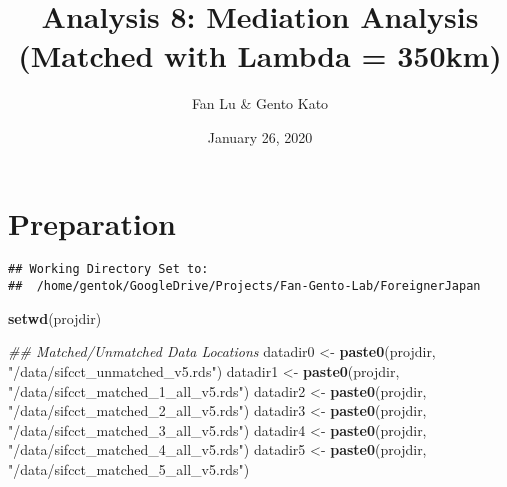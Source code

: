 \documentclass[
]{article}
\title{Analysis 8: Mediation Analysis (Matched with Lambda = 350km)}
\author{Fan Lu \& Gento Kato}
\date{January 26, 2020}
\newenvironment{Shaded}{\begin{snugshade}}{\end{snugshade}}
\newcommand{\CharTok}[1]{\textcolor[rgb]{0.31,0.60,0.02}{#1}}
\newcommand{\CommentTok}[1]{\textcolor[rgb]{0.56,0.35,0.01}{\textit{#1}}}
\newcommand{\ControlFlowTok}[1]{\textcolor[rgb]{0.13,0.29,0.53}{\textbf{#1}}}
\newcommand{\DataTypeTok}[1]{\textcolor[rgb]{0.13,0.29,0.53}{#1}}
\newcommand{\KeywordTok}[1]{\textcolor[rgb]{0.13,0.29,0.53}{\textbf{#1}}}
\newcommand{\NormalTok}[1]{#1}
\newcommand{\OperatorTok}[1]{\textcolor[rgb]{0.81,0.36,0.00}{\textbf{#1}}}
\newcommand{\OtherTok}[1]{\textcolor[rgb]{0.56,0.35,0.01}{#1}}
\newcommand{\StringTok}[1]{\textcolor[rgb]{0.31,0.60,0.02}{#1}}
\begin{document}
\maketitle

\hypertarget{preparation}{%
\section{Preparation}\label{preparation}}

\begin{Shaded}
\end{Shaded}

\begin{verbatim}
## Working Directory Set to:
##  /home/gentok/GoogleDrive/Projects/Fan-Gento-Lab/ForeignerJapan
\end{verbatim}

\begin{Shaded}
\begin{Highlighting}[]
\KeywordTok{setwd}\NormalTok{(projdir)}

\CommentTok{## Matched/Unmatched Data Locations}
\NormalTok{datadir0 <-}\StringTok{ }\KeywordTok{paste0}\NormalTok{(projdir, }\StringTok{"/data/sifcct_unmatched_v5.rds"}\NormalTok{)}
\NormalTok{datadir1 <-}\StringTok{ }\KeywordTok{paste0}\NormalTok{(projdir, }\StringTok{"/data/sifcct_matched_1_all_v5.rds"}\NormalTok{)}
\NormalTok{datadir2 <-}\StringTok{ }\KeywordTok{paste0}\NormalTok{(projdir, }\StringTok{"/data/sifcct_matched_2_all_v5.rds"}\NormalTok{)}
\NormalTok{datadir3 <-}\StringTok{ }\KeywordTok{paste0}\NormalTok{(projdir, }\StringTok{"/data/sifcct_matched_3_all_v5.rds"}\NormalTok{)}
\NormalTok{datadir4 <-}\StringTok{ }\KeywordTok{paste0}\NormalTok{(projdir, }\StringTok{"/data/sifcct_matched_4_all_v5.rds"}\NormalTok{)}
\NormalTok{datadir5 <-}\StringTok{ }\KeywordTok{paste0}\NormalTok{(projdir, }\StringTok{"/data/sifcct_matched_5_all_v5.rds"}\NormalTok{)}
\end{Highlighting}
\end{Shaded}
\end{document}
